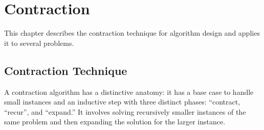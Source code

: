 \chapter{Contraction}
\label{ch:design::contraction}

\begin{cluster}
\label{grp:prmbl:design::contraction::describes}

\begin{preamble}
\label{prmbl:design::contraction::describes}
This chapter describes the contraction technique for algorithm design
and applies it to several problems.

\end{preamble}
\end{cluster}


\section{Contraction Technique}
\label{sec:design::contraction}

\begin{cluster}
\label{grp:grm:design::contraction::contraction}

\begin{gram}
\label{grm:design::contraction::contraction}
A contraction algorithm has a distinctive anatomy: it has a base case to handle small instances and an inductive step with three
distinct phases: ``contract, ``recur'', and ``expand.''
It  involves
solving recursively  smaller instances of the same problem and then expanding the solution for the larger instance.

\end{gram}
\end{cluster}

